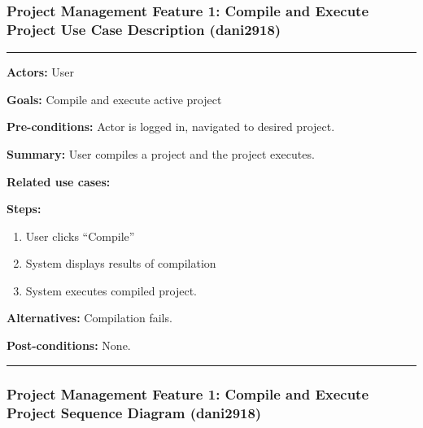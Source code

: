 \documentclass[twoside,letterpaper]{article}
\begin{document}
\newpage

\subsubsection[Project Management Feature 1: Use Case Description 1: Compile and execute project (dani2918)]{\rmfamily\bfseries\color{black}
	Project Management Feature 1: Compile and Execute Project Use Case Description (dani2918) }
\hypertarget{RefHeading22059017292}{}
\bigskip
\vspace{2pt}
\hrule
\vspace{8pt}
 \textbf{Actors:} User \newline
 
\noindent \textbf{Goals:} Compile and execute active project\newline

 \noindent \textbf{Pre-conditions:} Actor is logged in, navigated to desired project.  \newline
 
\noindent \textbf{Summary:} User compiles a project and the project executes.\newline

\noindent \textbf{Related use cases:} \newline

\noindent \textbf{Steps:} \begin{enumerate}
  \item User clicks ``Compile''
  \item System displays results of compilation
  \item System executes compiled project.
 \end{enumerate}
 \noindent \textbf{Alternatives:} Compilation fails. \newline
 
\noindent  \textbf{Post-conditions:} None. \newline
 
\vspace{8pt}
\hrule
\vspace{20pt}
\newpage
\subsubsection[Project Management Feature 1: Sequence Diagram 1: Compile and execute project (dani2918)]{\rmfamily\bfseries\color{black}
	Project Management Feature 1: Compile and Execute Project Sequence Diagram (dani2918) }

\bigskip
\end{document}
